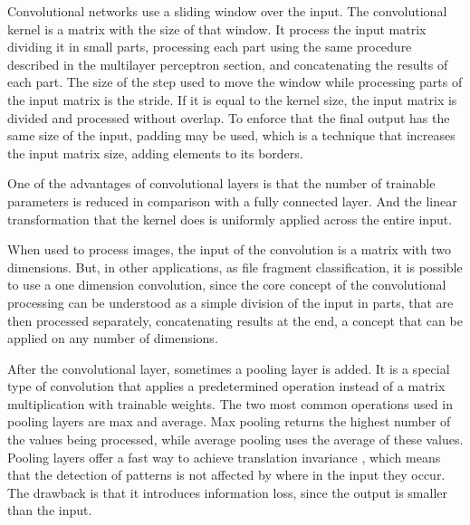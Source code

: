 
Convolutional networks \cite{lecun_backpropagation_1989} \cite{lecun_convolutional_1995} use a sliding window over the input. The convolutional kernel is a matrix with the size of that window. It process the input matrix dividing it in small parts, processing each part using the same procedure described in the multilayer perceptron section, and concatenating the results of each part. The size of the step used to move the window while processing parts of the input matrix is the stride. If it is equal to the kernel size, the input matrix is divided and processed without overlap. To enforce that the final output has the same size of the input, padding may be used, which is a technique that increases the input matrix size, adding elements to its borders.

One of the advantages of convolutional layers is that the number of trainable parameters is reduced in comparison with a fully connected layer. And the linear transformation that the kernel does is uniformly applied across the entire input.

When used to process images, the input of the convolution is a matrix with two dimensions. But, in other applications, as file fragment classification, it is possible to use a one dimension convolution, since the core concept of the convolutional processing can be understood as a simple division of the input in parts, that are then processed separately, concatenating results at the end, a concept that can be applied on any number of dimensions.


After the convolutional layer, sometimes a pooling layer is added. It is a special type of convolution that applies a predetermined operation instead of a matrix multiplication with trainable weights. The two most common operations used in pooling layers are max and average. Max pooling returns the highest number of the values being processed, while average pooling uses the average of these values. Pooling layers offer a fast way to achieve translation invariance \cite{hinton_learning_1987}, which means that the detection of patterns is not affected by where in the input they occur. The drawback is that it introduces information loss, since the output is smaller than the input.
